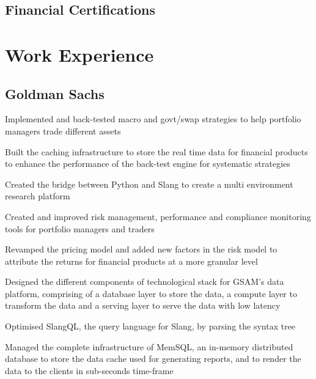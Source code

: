 \documentclass[]{resume-openfont}
\begin{document}
\begin{minipage}[t]{0.33\textwidth}
\subsection{Financial Certifications}

%
%

\end{minipage} 
\hfill
\begin{minipage}[t]{0.66\textwidth} 


\section{Work Experience}
\subsection{Goldman Sachs}
\vspace{\topsep} 
\begin{tightemize}
\item Implemented and back-tested macro and govt/swap strategies to help portfolio managers trade different assets
\item Built the caching infrastructure to store the real time data for financial products to enhance the performance of
the back-test engine for systematic strategies
\item Created the bridge between Python and Slang to create a multi environment research platform
\item Created and improved risk management, performance and compliance monitoring tools for portfolio managers and traders
\item Revamped the pricing model and added new factors in the risk model to attribute the returns for financial products at a more granular level
\end{tightemize}

\begin{tightemize}
\item Designed the different components of technological stack for GSAM’s data platform, comprising of a database layer
to store the data, a compute layer to transform the data and a serving layer to serve the data with low latency
\item Optimised SlangQL, the query language for Slang, by parsing the syntax tree
\item Managed the complete infrastructure of MemSQL, an in-memory distributed database to store the data cache
used for generating reports, and to render the data to the clients in sub-seconds time-frame
\end{tightemize}
\sectionsep


\end{minipage}
\end{document}
